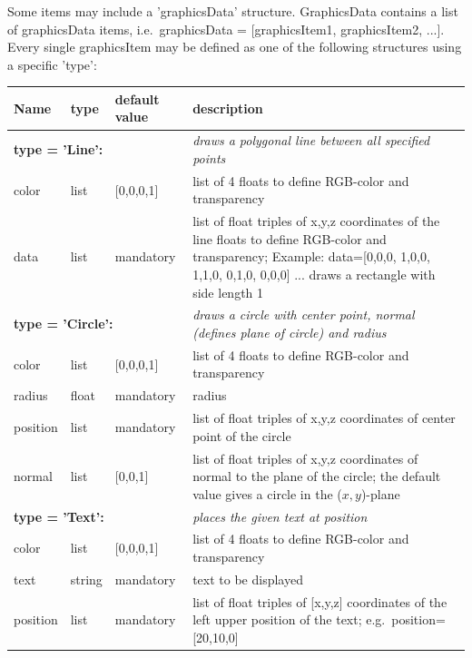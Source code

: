 \documentclass[11pt,a4paper]{book} %
\begin{document}


\newpage

Some items may include a 'graphicsData' structure. GraphicsData contains a list of graphicsData items, i.e.\ graphicsData = [graphicsItem1, graphicsItem2, ...]. Every single graphicsItem may be defined as one of the following structures using a specific 'type':
\begin{center}
  \footnotesize
  \begin{longtable}{| p{3cm} | p{2cm} | p{3cm} | p{7.5cm} |} 
	\hline
  \bf Name & \bf type & \bf default value & \bf description \\ \hline
%
	\multicolumn{3}{l}{\parbox{8cm}{\bf type = 'Line': }} & \multicolumn{1}{l}{\parbox{7.5cm}{\it draws a polygonal line between all specified points}}\\ \hline
  color & list & [0,0,0,1] & list of 4 floats to define RGB-color and transparency\\ \hline
  data & list &  mandatory & list of float triples of x,y,z coordinates of the line floats to define RGB-color and transparency; Example: data=[0,0,0, 1,0,0, 1,1,0, 0,1,0, 0,0,0] ... draws a rectangle with side length 1\\ \hline
%
	\multicolumn{3}{l}{\parbox{8cm}{\bf type = 'Circle': }} & \multicolumn{1}{l}{\parbox{7.5cm}{\it draws a circle with center point, normal (defines plane of circle) and radius}}\\ \hline
  color & list & [0,0,0,1] & list of 4 floats to define RGB-color and transparency\\ \hline
  radius & float & mandatory & radius\\ \hline
  position & list & mandatory & list of float triples of x,y,z coordinates of center point of the circle\\ \hline
  normal & list & [0,0,1] & list of float triples of x,y,z coordinates of normal to the plane of the circle; the default value gives a circle in the ($x,y$)-plane\\ \hline
	\multicolumn{3}{l}{\parbox{8cm}{\bf type = 'Text': }} & \multicolumn{1}{l}{\parbox{7.5cm}{\it places the given text at position}}\\ \hline
  color & list & [0,0,0,1] & list of 4 floats to define RGB-color and transparency\\ \hline
  text & string & mandatory & text to be displayed\\ \hline
  position & list & mandatory & list of float triples of [x,y,z] coordinates of the left upper position of the text; e.g.\ position=[20,10,0] \\ \hline

\end{longtable}
\end{center}
\end{document}
